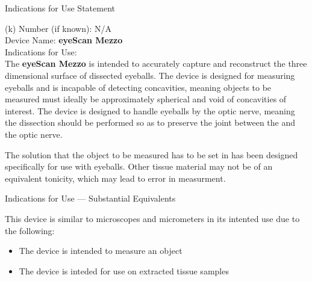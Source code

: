 \newpage
{}

\begin{center}
  \Large{Indications for Use Statement}\\[.5in]
\end{center}


\onehalfspacing

(k) Number (if known): N/A \\
Device Name: \textbf{eyeScan Mezzo} \\
Indications for Use: \\

The \textbf{eyeScan Mezzo} is intended to accurately capture and
reconstruct the three dimensional surface of dissected eyeballs. The
device is designed for measuring eyeballs and is incapable of
detecting concavities, meaning objects to be measured must ideally be
approximately spherical and void of concavities of interest. The
device is designed to handle eyeballs by the optic nerve, meaning the
dissection should be performed so as to preserve the joint between the
and the optic nerve.

The solution that the object to be measured has to be set in has been
designed specifically for use with eyeballs. Other tissue material may
not be of an equivalent tonicity, which may lead to error in
measurment.

\newpage

\begin{center}
  \Large{Indications for Use --- Substantial Equivalents}\\[.5in]
\end{center}

This device is similar to microscopes and micrometers in its intented
use due to the following:

\begin{itemize}
\item The device is intended to measure an object
\item The device is inteded for use on extracted tissue samples
\end{itemize}


